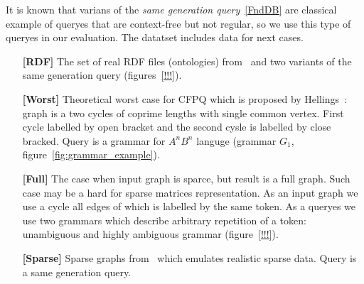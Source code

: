 It is known that varians of the \textit{same generation query}~\ref{FndDB} are classical example of queryes that are context-free but not regular, so we use this type of queryes in our evaluation.
The datatset includes data for next cases.
\begin{itemize}
\item[\textbf{[RDF]}] The set of real RDF files (ontologies) from~\cite{RDF} and two variants of the same generation query (figures~\ref{!!!}).

\item[\textbf{[Worst]}] Theoretical worst case for CFPQ which is proposed by Hellings~\cite{hellingsPathQuerying}: graph is a two cycles of coprime lengths with single common vertex.
First cycle labelled by open bracket and the second cysle is labelled by close bracked.
Query is a grammar for $A^nB^n$ languge (grammar $G_1$, figure~\ref{fig:grammar_example}).

\item[\textbf{[Full]}] The case when input graph is sparce, but result is a full graph. 
Such case may be a hard for sparse matrices representation.
As an input graph we use a cycle all edges of which is labelled by the same token.
As a queryes we use two grammars which describe arbitrary repetition of a token: unambiguous and highly ambiguous grammar (figure~\ref{!!!}). 

\item[\textbf{[Sparse]}] Sparse graphs from~\cite{fan2018scaling} which emulates realistic sparse data. 
Query is a same generation query.

\end{itemize}
